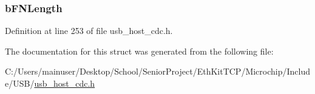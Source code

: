\subsubsection[{b\+F\+N\+Length}]{ b\+F\+N\+Length}\label{struct___u_s_b___c_d_c___h_e_a_d_e_r___f_n___d_s_c_a5cba7e463fbde92bb6daf4547a127a28}


Definition at line 253 of file usb\+\_\+host\+\_\+cdc.\+h.



The documentation for this struct was generated from the following file\+:\begin{DoxyCompactItemize}
\item 
C\+:/\+Users/mainuser/\+Desktop/\+School/\+Senior\+Project/\+Eth\+Kit\+T\+C\+P/\+Microchip/\+Include/\+U\+S\+B/\hyperlink{usb__host__cdc_8h}{usb\+\_\+host\+\_\+cdc.\+h}\end{DoxyCompactItemize}
